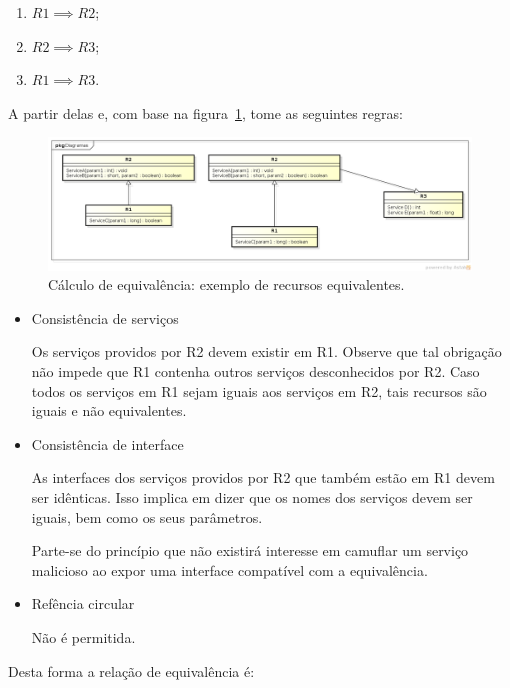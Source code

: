 \begin{enumerate}
	\item $R1 \implies R2$;
	\item $R2 \implies R3$;
	\item $R1 \implies R3$.
\end{enumerate}

A partir delas e, com base na figura~\ref{fig:calculoDeEquivalencia}, tome as seguintes regras:

\begin{figure}[ht]
	\center
	\includegraphics[scale=0.39]{imagens/calculoDeEquivalencia}
	\caption{Cálculo de equivalência: exemplo de recursos equivalentes.}
	\label{fig:calculoDeEquivalencia}
\end{figure}

\begin{itemize}
	\item Consistência de serviços

		Os serviços providos por R2 devem existir em R1. Observe que tal obrigação não impede que R1 contenha outros serviços desconhecidos por R2. Caso todos os serviços em R1 sejam iguais aos serviços em R2, tais recursos são iguais e não equivalentes.
	\item Consistência de interface

		As interfaces dos serviços providos por R2 que também estão em R1 devem ser idênticas. Isso implica em dizer que os nomes dos serviços devem ser iguais, bem como os seus parâmetros.

		Parte-se do princípio que não existirá interesse em camuflar um serviço malicioso ao expor uma interface compatível com a equivalência.
	\item Refência circular

		Não é permitida.
\end{itemize}


Desta forma a relação de equivalência é:

